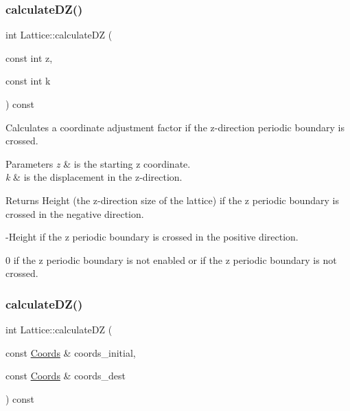 \subsubsection{\texorpdfstring{calculate\+D\+Z()}{calculateDZ()}\hspace{0.1cm}{\footnotesize\ttfamily [1/2]}}
{\footnotesize\ttfamily int Lattice\+::calculate\+DZ (\begin{DoxyParamCaption}\item[{const int}]{z,  }\item[{const int}]{k }\end{DoxyParamCaption}) const}



Calculates a coordinate adjustment factor if the z-\/direction periodic boundary is crossed. 


\begin{DoxyParams}{Parameters}
{\em z} & is the starting z coordinate. \\
\hline
{\em k} & is the displacement in the z-\/direction. \\
\hline
\end{DoxyParams}
\begin{DoxyReturn}{Returns}
Height (the z-\/direction size of the lattice) if the z periodic boundary is crossed in the negative direction. 

-\/\+Height if the z periodic boundary is crossed in the positive direction. 

0 if the z periodic boundary is not enabled or if the z periodic boundary is not crossed. 
\end{DoxyReturn}
\mbox{\label{class_lattice_a76b38079e102e17c79b13a3398a404a0}} 
\subsubsection{\texorpdfstring{calculate\+D\+Z()}{calculateDZ()}\hspace{0.1cm}{\footnotesize\ttfamily [2/2]}}
{\footnotesize\ttfamily int Lattice\+::calculate\+DZ (\begin{DoxyParamCaption}\item[{const \hyperlink{struct_coords}{Coords} \&}]{coords\+\_\+initial,  }\item[{const \hyperlink{struct_coords}{Coords} \&}]{coords\+\_\+dest }\end{DoxyParamCaption}) const}



